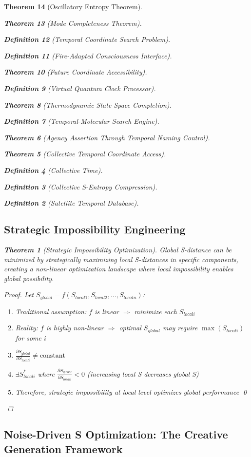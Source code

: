 \documentclass[12pt,a4paper]{article}
\newtheorem{theorem}{Theorem}[section]
\newtheorem{definition}[theorem]{Definition}
\begin{document}
\begin{theorem}[Oscillatory Entropy Theorem]
\begin{theorem}[Mode Completeness Theorem]
\begin{enumerate}
\begin{definition}[Temporal Coordinate Search Problem]
\begin{algorithm}
\begin{definition}[Fire-Adapted Consciousness Interface]
\begin{theorem}[Future Coordinate Accessibility]
\begin{definition}[Virtual Quantum Clock Processor]
\begin{itemize}
\begin{itemize}
\begin{theorem}[Thermodynamic State Space Completion]
\begin{definition}[Temporal-Molecular Search Engine]
\begin{theorem}[Agency Assertion Through Temporal Naming Control]
\begin{remark}
\begin{theorem}[Collective Temporal Coordinate Access]
\begin{definition}[Collective Time]
\begin{definition}[Collective S-Entropy Compression]
\begin{definition}[Satellite Temporal Database]
\begin{algorithm}
\begin{table}[h]
{{\subsection{Strategic Impossibility Engineering}

\begin{theorem}[Strategic Impossibility Optimization]
Global S-distance can be minimized by strategically maximizing local S-distances in specific components, creating a non-linear optimization landscape where local impossibility enables global possibility.
\end{theorem}

\begin{proof}
Let $S_{global} = f(S_{local1}, S_{local2}, \ldots, S_{localn})$:
\begin{enumerate}
\item Traditional assumption: $f$ is linear $\Rightarrow$ minimize each $S_{locali}$
\item Reality: $f$ is highly non-linear $\Rightarrow$ optimal $S_{global}$ may require $\max(S_{locali})$ for some $i$
\item $\frac{\partial S_{global}}{\partial S_{locali}} \neq \text{constant}$
\item $\exists S_{locali}^*$ where $\frac{\partial S_{global}}{\partial S_{locali}} < 0$ (increasing local S decreases global S)
\item Therefore, strategic impossibility at local level optimizes global performance \qed
\end{enumerate}
\end{proof}

\subsection{Noise-Driven S Optimization: The Creative Generation Framework}

}}
\end{table}
\end{algorithm}
\end{definition}
\end{definition}
\end{definition}
\end{theorem}
\end{remark}
\end{theorem}
\end{definition}
\end{theorem}
\end{itemize}
\end{itemize}
\end{definition}
\end{theorem}
\end{definition}
\end{algorithm}
\end{definition}
\end{enumerate}
\end{theorem}
\end{theorem}
\end{document}

